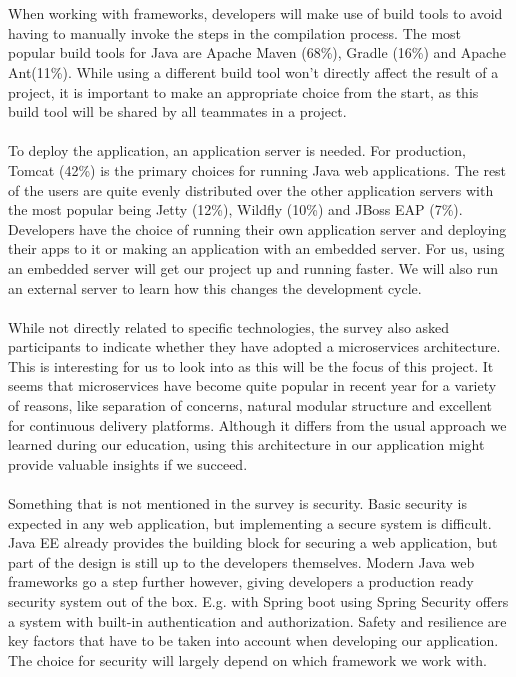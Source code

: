 \documentclass[12pt]{article}
\begin{document}
\begin{multicols}{2}
\\\\
When working with frameworks, developers will make use of build tools to avoid having to manually invoke the steps in the compilation process. The most popular build tools for Java are Apache Maven (68\%), Gradle (16\%) and Apache Ant(11\%). While using a different build tool won't directly affect the result of a project, it is important to make an appropriate choice from the start, as this build tool will be shared by all teammates in a project. 
\\\\
To deploy the application, an application server is needed. For production, Tomcat (42\%) is the primary choices for running Java web applications. The rest of the users are quite evenly distributed over the other application servers with the most popular being Jetty (12\%), Wildfly (10\%) and JBoss EAP (7\%). Developers have the choice of running their own application server and deploying their apps to it or making an application with an embedded server. For us, using an embedded server will get our project up and running faster. We will also run an external server to learn how this changes the development cycle. 
\\\\
While not directly related to specific technologies, the survey also asked participants to indicate whether they have adopted a microservices architecture. This is interesting for us to look into as this will be the focus of this project. It seems that microservices have become quite popular in recent year for a variety of reasons, like separation of concerns, natural modular structure and excellent for continuous delivery platforms. \cite{WhyMicroservices48:online} Although it differs from the usual approach we learned during our education, using this architecture in our application might provide valuable insights if we succeed.  
\\\\
Something that is not mentioned in the survey is security. Basic security is expected in any web application, but implementing a secure system is difficult. Java EE already provides the building block for securing a web application, but part of the design is still up to the developers themselves.\cite{JavaEESecurity29:online} Modern Java web frameworks go a step further however, giving developers a production ready security system out of the box. E.g. with Spring boot using Spring Security offers a system with built-in authentication and authorization. Safety and resilience are key factors that have to be taken into account when developing our application. The choice for security will largely depend on which framework we work with. 

\end{multicols}
\end{document}
